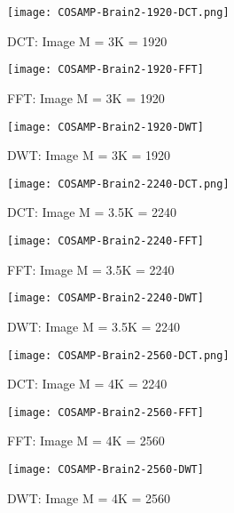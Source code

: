\documentclass[titlepage,oneside, 12pt]{book}
\theoremstyle{break}
\begin{document}
\begin{figure}[!h]
\centering
{}
  \texttt{[image: COSAMP-Brain2-1920-DCT.png]}
  \caption{DCT: Image M = 3K = 1920}\label{fig:COSAMP-Brain2-1920-DCT}
\endminipage
\hspace*{2em}
  \texttt{[image: COSAMP-Brain2-1920-FFT]}
  \caption{FFT: Image M = 3K = 1920}\label{fig:COSAMP-Brain2-1920-FFT}
\endminipage
\hspace*{2em}
%
  \texttt{[image: COSAMP-Brain2-1920-DWT]}
  \caption{DWT: Image M = 3K = 1920}\label{fig:COSAMP-Brain2-1920-DWT}
\endminipage
\hspace*{2em}
\end{figure}


\begin{figure}[!h]
\centering
{}
  \texttt{[image: COSAMP-Brain2-2240-DCT.png]}
  \caption{DCT: Image M = 3.5K = 2240}\label{fig:COSAMP-Brain2-2240-DCT}
\endminipage
\hspace*{2em}
  \texttt{[image: COSAMP-Brain2-2240-FFT]}
  \caption{FFT: Image M = 3.5K = 2240}\label{fig:COSAMP-Brain2-2240-FFT}
\endminipage
\hspace*{2em}
%
  \texttt{[image: COSAMP-Brain2-2240-DWT]}
  \caption{DWT: Image M = 3.5K = 2240}\label{fig:COSAMP-Brain2-2240-DWT}
\endminipage
\hspace*{2em}
\end{figure}

\clearpage

\begin{figure}[!h]
\centering
{}
  \texttt{[image: COSAMP-Brain2-2560-DCT.png]}
  \caption{DCT: Image M = 4K = 2240}\label{fig:COSAMP-Brain2-2560-DCT}
\endminipage
\hspace*{2em}
  \texttt{[image: COSAMP-Brain2-2560-FFT]}
  \caption{FFT: Image M = 4K = 2560}\label{fig:COSAMP-Brain2-2560-FFT}
\endminipage
\hspace*{2em}
%
  \texttt{[image: COSAMP-Brain2-2560-DWT]}
  \caption{DWT: Image M = 4K = 2560}\label{fig:COSAMP-Brain2-2560-DWT}
\endminipage
\hspace*{2em}
\end{figure}
\end{document}
